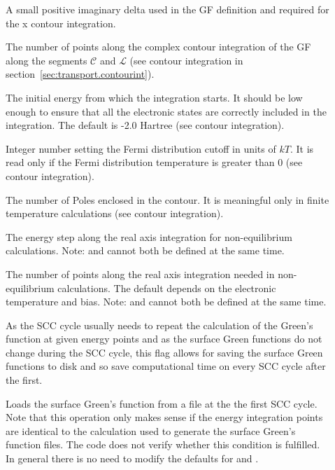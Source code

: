\begin{description}
\item[] A small positive imaginary delta used
  in the GF definition and required for the x contour integration.
\item[] The number of points along the complex contour
  integration of the GF along the segments $\mathcal{C}$ and $\mathcal{L}$ (see
  contour integration in section~\ref{sec:transport.contourint}).
\item[] The initial energy from which
  the integration starts. It should be low enough to ensure that all the
  electronic states are correctly included in the integration. The default is
  -2.0 Hartree (see contour integration).
\item[] Integer number setting the Fermi distribution cutoff in
  units of $kT$. It is read only if the Fermi distribution temperature is
  greater than 0 (see contour integration).
\item[] The number of Poles enclosed in the contour. It is
  meaningful only in finite temperature calculations (see contour integration).
\item[] The energy step along the real
  axis integration for non-equilibrium calculations. Note:  and
   cannot both be defined at the same time.

\item[] The number of points along the real axis integration
  needed in non-equilibrium calculations. The default depends on the electronic
  temperature and bias. Note:  and  cannot
  both be defined at the same time.

\item[] As the SCC cycle usually needs to repeat the
  calculation of the Green's function at given energy points and as the surface
  Green functions do not change during the SCC cycle, this flag allows for
  saving the surface Green functions to disk and so save computational time on
  every SCC cycle after the first.

\item[] Loads the surface Green's function from a file at the
  the first SCC cycle. Note that this operation only makes sense if the energy
  integration points are identical to the calculation used to generate the
  surface Green's function files. The code does not verify whether this
  condition is fulfilled. In general there is no need to modify the defaults for
   and .


\end{description}
